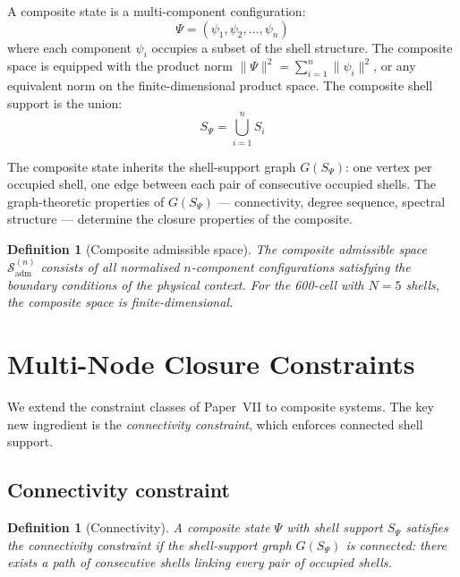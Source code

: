 \documentclass[12pt]{article}
\newtheorem{definition}[theorem]{Definition}
\newcommand{\Sadm}{\mathcal{S}_{\mathrm{adm}}}
\begin{document}
A composite state is a multi-component configuration:
\begin{equation}\label{eq:composite}
    \Psi = (\psi_1, \psi_2, \ldots, \psi_n)
\end{equation}
where each component $\psi_i$ occupies a subset of the shell structure. The composite space is equipped with the product norm $\|\Psi\|^2 = \sum_{i=1}^n \|\psi_i\|^2$, or any equivalent norm on the finite-dimensional product space. The composite shell support is the union:
\begin{equation}
    S_\Psi = \bigcup_{i=1}^{n} S_i
\end{equation}

The composite state inherits the shell-support graph $G(S_\Psi)$: one vertex per occupied shell, one edge between each pair of consecutive occupied shells. The graph-theoretic properties of $G(S_\Psi)$ --- connectivity, degree sequence, spectral structure --- determine the closure properties of the composite.

\begin{definition}[Composite admissible space]\label{def:compadm}
The composite admissible space $\Sadm^{(n)}$ consists of all normalised $n$-component configurations satisfying the boundary conditions of the physical context. For the 600-cell with $N = 5$ shells, the composite space is finite-dimensional.
\end{definition}

\section{Multi-Node Closure Constraints}\label{sec:constraints}

We extend the constraint classes of Paper~VII to composite systems. The key new ingredient is the \textit{connectivity constraint}, which enforces connected shell support.

\subsection{Connectivity constraint}

\begin{definition}[Connectivity]\label{def:connectivity}
A composite state $\Psi$ with shell support $S_\Psi$ satisfies the connectivity constraint if the shell-support graph $G(S_\Psi)$ is connected: there exists a path of consecutive shells linking every pair of occupied shells.
\end{definition}
\end{document}
